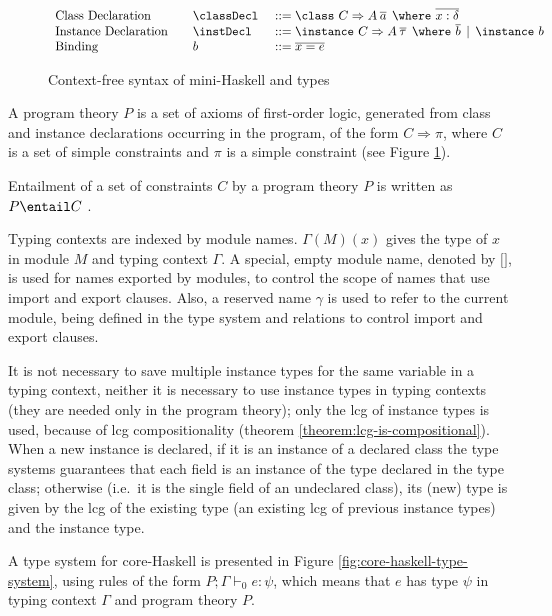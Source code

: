 \begin{figure}
\[\begin{array}[c]{llll}
\textrm{Class Declaration}  &         & \classDecl\    & ::= \class\ C \Rightarrow A\: \overline{a}\:\: \where\ \overline{x:\delta}\\
\textrm{Instance Declaration} &       & \instDecl\     & ::= \instance\ C \Rightarrow A\: \overline{\tau}\:\: \where\ \overline{b} 
                                                             \,\mid\, \instance\ b\\
\textrm{Binding}              &       & b              & ::= \overline{x = e} 
\end{array} \]
\caption{Context-free syntax of mini-Haskell and types}
\label{fig:mini-Haskell-context-free-syntax}
\end{figure}

A program theory $P$ is a set of axioms of first-order logic,
generated from class and instance declarations occurring in the
program, of the form $C \Rightarrow \pi$, where $C$ is a set of simple
constraints and $\pi$ is a simple constraint (see Figure
\ref{fig:mini-Haskell-context-free-syntax}). 

Entailment of a set of constraints $C$ by a program theory $P$ is
written as $P \entail C$
\cite{JBCS-Ambiguity-and-constrained-polymorphism}.

Typing contexts are indexed by module names. $\Gamma(M)(x)$ gives the
type of $x$ in module $M$ and typing context $\Gamma$. A special,
empty module name, denoted by $\texttt{[]}$, is used for names
exported by modules, to control the scope of names that use import and
export clauses. Also, a reserved name $\gamma$ is used to refer to the
current module, being defined in the type system and relations to
control import and export clauses.

It is not necessary to save multiple instance types for the same
variable in a typing context, neither it is necessary to use instance
types in typing contexts (they are needed only in the program theory);
only the lcg of instance types is used, because of lcg
compositionality (theorem \ref{theorem:lcg-is-compositional}). When a
new instance is declared, if it is an instance of a declared class the
type systems guarantees that each field is an instance of the type
declared in the type class; otherwise (i.e.~it is the single field of
an undeclared class), its (new) type is given by the lcg of the
existing type (an existing lcg of previous instance types) and the
instance type.

A type system for core-Haskell is presented in Figure
\ref{fig:core-haskell-type-system}, using rules of the form $P;\Gamma
\vdash_0 e:\psi$, which means that $e$ has type $\psi$ in typing
context $\Gamma$ and program theory $P$.

